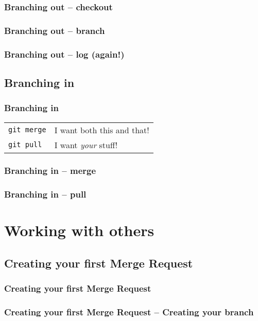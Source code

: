 \documentclass{beamer}
\begin{document}
\begin{frame}
  \frametitle{Branching out -- checkout}
\end{frame}

\begin{frame}
  \frametitle{Branching out -- branch}
\end{frame}

\begin{frame}
  \frametitle{Branching out -- log (again!)}
\end{frame}

\subsection{Branching in}

\begin{frame}[fragile]
  \frametitle{Branching in}

  \begin{tabular}{ll}
    \texttt{git merge} & I want both this and that! \\
    \texttt{git pull} & I want \emph{your} stuff! \\
  \end{tabular}

\end{frame}

\begin{frame}
  \frametitle{Branching in -- merge}
\end{frame}

\begin{frame}
  \frametitle{Branching in -- pull}
\end{frame}



\section{Working with others}
\subsection{Creating your first Merge Request}

\begin{frame}[fragile]
  \frametitle{Creating your first Merge Request}
\end{frame}

\begin{frame}[fragile]
  \frametitle{Creating your first Merge Request -- Creating your branch}
\end{frame}
\end{document}

